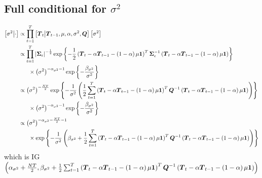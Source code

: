 \documentclass{article}\usepackage[]{graphicx}\usepackage[]{color}
\def\bm#1{\mbox{\boldmath $#1$}}
\begin{document}
\subsection{Full conditional for $\sigma^2$}
%
\begin{align*}
%
\left[ \sigma^2 \middle| \cdot \right] & \propto \prod_{t = 1}^T \left[ \bm{T}_t \middle| \bm{T}_{t - 1}, \mu, \alpha, \sigma^2, \bm{Q} \right] \left[ \sigma^2 \right]\\
%
& \propto \prod_{t = 1}^T \left| \bm{\Sigma}_\epsilon \right|^{ - \frac{1} {2} } \exp{ \left\{ - \frac{1} {2} \left( \bm{T}_t  - \alpha \bm{T}_{t - 1} - \left( 1 - \alpha \right) \mu \bm{1} \right)^T \bm{\Sigma}_\epsilon^{ - 1} \left( \bm{T}_t  - \alpha \bm{T}_{t - 1} - \left( 1 - \alpha \right) \mu \bm{1} \right) \right\} }\\
& \hspace{6mm} \times \left( \sigma^2 \right)^{ - \alpha_{\sigma^2} - 1} \exp{ \left\{ - \frac{\beta_{\sigma^2}} {\sigma^2} \right\} } \\
%
& \propto \left( \sigma^2 \right)^{ - \frac{N T} {2} } \exp{ \left\{ - \frac{1} {\sigma^2} \left( \frac{1} {2} \sum_{t = 1}^T \left( \bm{T}_t  - \alpha \bm{T}_{t - 1} - \left( 1 - \alpha \right) \mu \bm{1} \right)^T \bm{Q}^{ - 1} \left( \bm{T}_t  - \alpha \bm{T}_{t - 1} - \left( 1 - \alpha \right) \mu \bm{1} \right) \right) \right\} }\\
& \hspace{6mm} \times \left( \sigma^2 \right)^{ - \alpha_{\sigma^2} - 1} \exp{ \left\{ - \frac{\beta_{\sigma^2}} {\sigma^2} \right\} } \\
%
& \propto \left( \sigma^2 \right)^{ - \alpha_{\sigma^2} - \frac{N T} {2} - 1}\\
& \hspace{6mm} \times \exp{ \left\{ - \frac{1} {\sigma^2} \left( \beta_{\sigma^2} + \frac{1} {2} \sum_{t = 1}^T \left( \bm{T}_t  - \alpha \bm{T}_{t - 1} - \left( 1 - \alpha \right) \mu \bm{1} \right)^T \bm{Q}^{ - 1} \left( \bm{T}_t  - \alpha \bm{T}_{t - 1} - \left( 1 - \alpha \right) \mu \bm{1} \right) \right) \right\} }\\
%
\end{align*}
%
which is IG$\left( \alpha_{\sigma^2} + \frac{N T} {2}, \beta_{\sigma^2} + \frac{1} {2} \sum_{t = 1}^T \left( \bm{T}_t  - \alpha \bm{T}_{t - 1} - \left( 1 - \alpha \right) \mu \bm{1} \right)^T \bm{Q}^{ - 1} \left( \bm{T}_t  - \alpha \bm{T}_{t - 1} - \left( 1 - \alpha \right) \mu \bm{1} \right) \right)$
%
%
\end{document}

